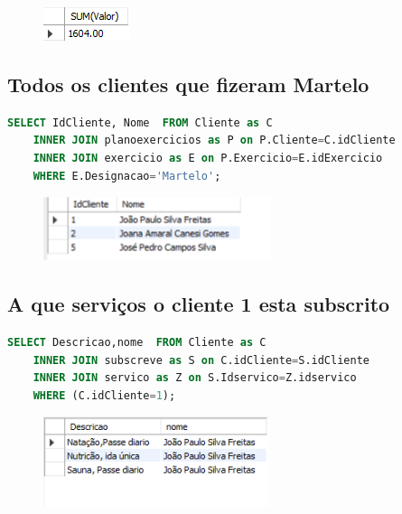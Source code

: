 \begin{figure}[h]
\begin{center}
\includegraphics[scale=0.7]{implementacao_fisica/soma.png}
\centering
\end{center}
\end{figure}

\subsection{Todos os clientes que fizeram Martelo}
\begin{lstlisting}[language=SQL]
SELECT IdCliente, Nome  FROM Cliente as C
	INNER JOIN planoexercicios as P on P.Cliente=C.idCliente
	INNER JOIN exercicio as E on P.Exercicio=E.idExercicio
	WHERE E.Designacao='Martelo';
\end{lstlisting}

\begin{figure}[h]
\begin{center}
\includegraphics[scale=1.0]{implementacao_fisica/ClientesMartelo.png} 
\centering
\end{center}
\end{figure}
\clearpage
\subsection{A que serviços o cliente 1 esta subscrito}
\begin{lstlisting}[language=SQL]
SELECT Descricao,nome  FROM Cliente as C
	INNER JOIN subscreve as S on C.idCliente=S.idCliente
    INNER JOIN servico as Z on S.Idservico=Z.idservico
    WHERE (C.idCliente=1);
\end{lstlisting}

\begin{figure}[h]
\begin{center}
\includegraphics[scale=1.0]{implementacao_fisica/Servicoscliente1.png} 
\centering
\end{center}
\end{figure}

